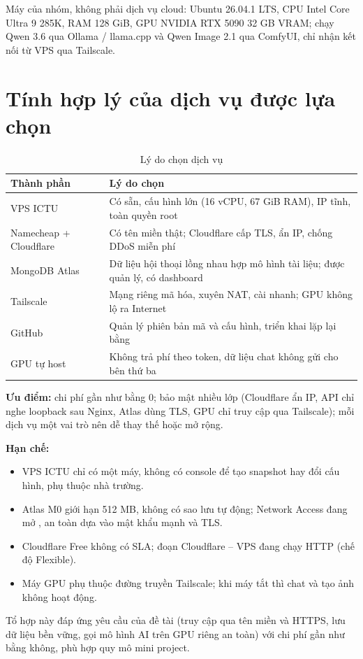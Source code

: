 \documentclass[
a4paper,
fontsize=12pt,
DIV=calc,
oneside,
numbers=enddot,
captions=tableheading,
bibliography=totoc,
]{scrreprt}
\newcommand{\tenLLM}{Qwen 3.6}
\newcommand{\tenImage}{Qwen Image 2.1}
\newcommand{\code}[1]{\texttt{\detokenize{#1}}}
\begin{document}
	Máy của nhóm, không phải dịch vụ cloud: Ubuntu 26.04.1 LTS, CPU Intel Core Ultra 9 285K, RAM 128 GiB, GPU NVIDIA RTX 5090 32 GB VRAM; chạy \tenLLM{} qua Ollama / llama.cpp và \tenImage{} qua ComfyUI, chỉ nhận kết nối từ VPS qua Tailscale.

	\section{Tính hợp lý của dịch vụ được lựa chọn}

	\begin{table}[H]
		\centering
		\caption{Lý do chọn dịch vụ}\label{tab:hopli}
		\small
		\begin{tabularx}{\linewidth}{|p{3cm}|L|}
			\hline
			\textbf{Thành phần} & \textbf{Lý do chọn} \\ \hline
			VPS ICTU & Có sẵn, cấu hình lớn (16 vCPU, 67 GiB RAM), IP tĩnh, toàn quyền root \\ \hline
			Namecheap + Cloudflare & Có tên miền thật; Cloudflare cấp TLS, ẩn IP, chống DDoS miễn phí \\ \hline
			MongoDB Atlas & Dữ liệu hội thoại lồng nhau hợp mô hình tài liệu; được quản lý, có dashboard \\ \hline
			Tailscale & Mạng riêng mã hóa, xuyên NAT, cài nhanh; GPU không lộ ra Internet \\ \hline
			GitHub & Quản lý phiên bản mã và cấu hình, triển khai lặp lại bằng \code{git pull} \\ \hline
			GPU tự host & Không trả phí theo token, dữ liệu chat không gửi cho bên thứ ba \\ \hline
		\end{tabularx}
	\end{table}

	\textbf{Ưu điểm:} chi phí gần như bằng 0; bảo mật nhiều lớp (Cloudflare ẩn IP, API chỉ nghe loopback sau Nginx, Atlas dùng TLS, GPU chỉ truy cập qua Tailscale); mỗi dịch vụ một vai trò nên dễ thay thế hoặc mở rộng.

	\textbf{Hạn chế:}
	\begin{itemize}
		\item VPS ICTU chỉ có một máy, không có console để tạo snapshot hay đổi cấu hình, phụ thuộc nhà trường.
		\item Atlas M0 giới hạn 512 MB, không có sao lưu tự động; Network Access đang mở \code{0.0.0.0/0}, an toàn dựa vào mật khẩu mạnh và TLS.
		\item Cloudflare Free không có SLA; đoạn Cloudflare -- VPS đang chạy HTTP (chế độ Flexible).
		\item Máy GPU phụ thuộc đường truyền Tailscale; khi máy tắt thì chat và tạo ảnh không hoạt động.
	\end{itemize}

	Tổ hợp này đáp ứng yêu cầu của đề tài (truy cập qua tên miền và HTTPS, lưu dữ liệu bền vững, gọi mô hình AI trên GPU riêng an toàn) với chi phí gần như bằng không, phù hợp quy mô mini project.
\end{document}

